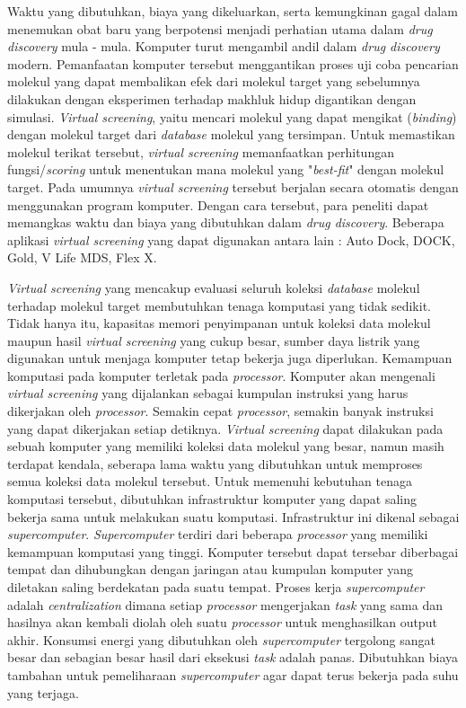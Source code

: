 Waktu yang dibutuhkan, biaya yang dikeluarkan, serta kemungkinan gagal dalam menemukan obat baru yang berpotensi menjadi perhatian utama dalam \textit{drug discovery} mula - mula. Komputer turut mengambil andil dalam \textit{drug discovery} modern. Pemanfaatan komputer tersebut menggantikan proses uji coba pencarian molekul yang dapat membalikan efek dari molekul target yang sebelumnya dilakukan dengan eksperimen terhadap makhluk hidup digantikan dengan simulasi. \textit{Virtual screening}, yaitu mencari molekul yang dapat mengikat (\textit{binding}) dengan molekul target dari \textit{database} molekul yang tersimpan. Untuk memastikan molekul terikat tersebut, \textit{virtual screening} memanfaatkan perhitungan fungsi/\textit{scoring} untuk menentukan mana molekul yang "\textit{best-fit}" dengan molekul target. Pada umumnya \textit{virtual screening} tersebut berjalan secara otomatis dengan menggunakan program komputer. Dengan cara tersebut, para peneliti dapat memangkas waktu dan biaya yang dibutuhkan dalam \textit{drug discovery}. Beberapa aplikasi \textit{virtual screening} yang dapat digunakan antara lain : Auto Dock, DOCK, Gold, V Life MDS, Flex X.

\textit{Virtual screening} yang mencakup evaluasi seluruh koleksi \textit{database} molekul terhadap molekul target membutuhkan tenaga komputasi yang tidak sedikit. Tidak hanya itu, kapasitas memori penyimpanan untuk koleksi data molekul maupun hasil \textit{virtual screening} yang cukup besar, sumber daya listrik yang digunakan untuk menjaga komputer tetap bekerja juga diperlukan. Kemampuan komputasi pada komputer terletak pada \textit{processor}. Komputer akan mengenali \textit{virtual screening} yang dijalankan sebagai kumpulan instruksi yang harus dikerjakan oleh \textit{processor}. Semakin cepat \textit{processor}, semakin banyak instruksi yang dapat dikerjakan setiap detiknya. \textit{Virtual screening} dapat dilakukan pada sebuah komputer yang memiliki koleksi data molekul yang besar, namun masih terdapat kendala, seberapa lama waktu yang dibutuhkan untuk memproses semua koleksi data molekul tersebut. Untuk memenuhi kebutuhan tenaga komputasi tersebut, dibutuhkan infrastruktur komputer yang dapat saling bekerja sama untuk melakukan suatu komputasi. Infrastruktur ini dikenal sebagai \textit{supercomputer}. \textit{Supercomputer} terdiri dari beberapa \textit{processor} yang memiliki kemampuan komputasi yang tinggi. Komputer tersebut dapat tersebar diberbagai tempat dan dihubungkan dengan jaringan atau kumpulan komputer yang diletakan saling berdekatan pada suatu tempat. Proses kerja \textit{supercomputer} adalah \textit{centralization} dimana setiap \textit{processor} mengerjakan \textit{task} yang sama dan hasilnya akan kembali diolah oleh suatu \textit{processor} untuk menghasilkan output akhir. Konsumsi energi yang dibutuhkan oleh \textit{supercomputer} tergolong sangat besar dan sebagian besar hasil dari eksekusi \textit{task} adalah panas. Dibutuhkan biaya tambahan untuk pemeliharaan \textit{supercomputer} agar dapat terus bekerja pada suhu yang terjaga.

